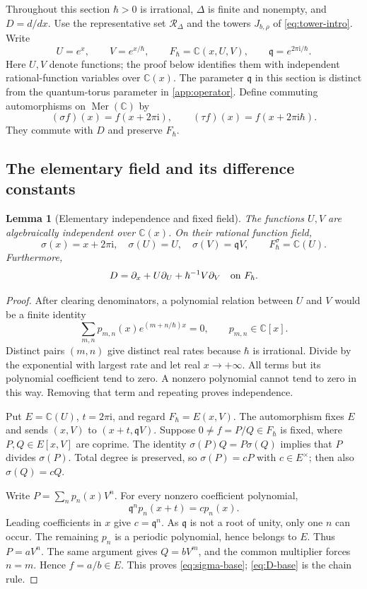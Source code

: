 \documentclass[11pt]{article}
\numberwithin{equation}{section}
\newtheorem{lemma}[lemma]{Lemma}
\theoremstyle{definition}
\theoremstyle{remark}
\newcommand{\C}{\mathbb C}
\newcommand{\ii}{\mathrm i}
\newcommand{\Mer}{\operatorname{Mer}}
\newcommand{\qh}{\hbar}
\begin{document}
Throughout this section $\qh>0$ is irrational, $\Delta$ is finite and nonempty,
and $D=d/dx$. Use the representative set $\mathscr R_\Delta$ and the towers
$J_{b,\rho}$ of \eqref{eq:tower-intro}. Write
\begin{equation}\label{eq:elementarybase}
 U=e^x,\qquad V=e^{x/\qh},\qquad F_\qh=\C(x,U,V),\qquad
 \mathfrak q=e^{2\pi\ii/\qh}.
\end{equation}
Here $U,V$ denote functions; the proof below identifies them with independent
rational-function variables over $\C(x)$. The parameter $\mathfrak q$ in this
section is distinct from the quantum-torus parameter in \cref{app:operator}.
Define commuting automorphisms on $\Mer(\C)$ by
\[
 (\sigma f)(x)=f(x+2\pi\ii),\qquad
 (\tau f)(x)=f(x+2\pi\ii\qh).
\]
They commute with $D$ and preserve $F_\qh$.

\subsection{The elementary field and its difference constants}

\begin{lemma}[Elementary independence and fixed field]\label{lem:fixedfield}
The functions $U,V$ are algebraically independent over $\C(x)$. On their
rational function field,
\begin{equation}\label{eq:sigma-base}
 \sigma(x)=x+2\pi\ii,\quad \sigma(U)=U,\quad
 \sigma(V)=\mathfrak qV,\qquad F_\qh^\sigma=\C(U).
\end{equation}
Furthermore,
\begin{equation}\label{eq:D-base}
 D=\partial_x+U\partial_U+\qh^{-1}V\partial_V
 \quad\hbox{on }F_\qh.
\end{equation}
\end{lemma}
\begin{proof}
After clearing denominators, a polynomial relation between $U$ and $V$ would
be a finite identity
\[
 \sum_{m,n}p_{m,n}(x)e^{(m+n/\qh)x}=0,
 \qquad p_{m,n}\in\C[x].
\]
Distinct pairs $(m,n)$ give distinct real rates because $\qh$ is irrational.
Divide by the exponential with largest rate and let real $x\to+\infty$.
All terms but its polynomial coefficient tend to zero. A nonzero polynomial
cannot tend to zero in this way. Removing that term and repeating proves
independence.

Put $E=\C(U)$, $t=2\pi\ii$, and regard $F_\qh=E(x,V)$. The automorphism
fixes $E$ and sends $(x,V)$ to $(x+t,\mathfrak qV)$.
Suppose $0\ne f=P/Q\in F_\qh$ is fixed, where $P,Q\in E[x,V]$ are coprime.
The identity $\sigma(P)Q=P\sigma(Q)$ implies that $P$ divides $\sigma(P)$.
Total degree is preserved, so $\sigma(P)=cP$ with $c\in E^\times$;
then also $\sigma(Q)=cQ$.

Write $P=\sum_np_n(x)V^n$. For every nonzero coefficient polynomial,
\[
 \mathfrak q^n p_n(x+t)=c p_n(x).
\]
Leading coefficients in $x$ give $c=\mathfrak q^n$. As $\mathfrak q$ is not
a root of unity, only one $n$ can occur. The remaining $p_n$ is a periodic
polynomial, hence belongs to $E$. Thus $P=aV^n$. The same argument gives
$Q=bV^m$, and the common multiplier forces $n=m$. Hence $f=a/b\in E$.
This proves \eqref{eq:sigma-base}; \eqref{eq:D-base} is the chain rule.
\end{proof}
\end{document}
